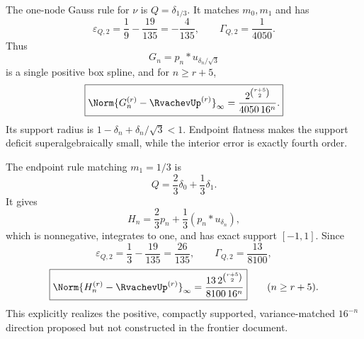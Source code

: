 \documentclass[11pt,oneside]{article}
\numberwithin{equation}{section}
\theoremstyle{definition}
\theoremstyle{remark}
\begin{document}
\begin{example}
\label{p3:ex:gauss-one}
The one-node Gauss rule for $\nu$ is $Q=\delta_{1/3}$.  It matches $m_0,m_1$ and
has
\[
 \varepsilon_{Q,2}=\frac19-\frac{19}{135}=-\frac4{135},
 \qquad \Gamma_{Q,2}=\frac1{4050}.
\]
Thus
\begin{equation}
 G_n=p_n*u_{\delta_n/\sqrt3}
 \label{p3:eq:Gn}
\end{equation}
is a single positive box spline, and for $n\ge r+5$,
\begin{equation}
 \boxed{
 \Norm{G_n^{(r)}-\RvachevUp^{(r)}}_\infty
 =\frac{2^{\binom{r+5}{2}}}{4050\,16^n}.}
 \label{p3:eq:Gauss-one-law}
\end{equation}
Its support radius is $1-\delta_n+\delta_n/\sqrt3<1$.  Endpoint flatness makes the
support deficit superalgebraically small, while the interior error is exactly fourth
order.
\end{example}

\begin{example}
\label{p3:ex:lobatto-two}
The endpoint rule matching $m_1=1/3$ is
\begin{equation}
 Q=\frac23\delta_0+\frac13\delta_1.
 \label{p3:eq:lobatto-Q}
\end{equation}
It gives
\begin{equation}
 H_n=\frac23p_n+\frac13(p_n*u_{\delta_n}),
 \label{p3:eq:Hn}
\end{equation}
which is nonnegative, integrates to one, and has exact support $[-1,1]$.  Since
\[
 \varepsilon_{Q,2}=\frac13-\frac{19}{135}=\frac{26}{135},
 \qquad \Gamma_{Q,2}=\frac{13}{8100},
\]
\begin{equation}
 \boxed{
 \Norm{H_n^{(r)}-\RvachevUp^{(r)}}_\infty
 =\frac{13\,2^{\binom{r+5}{2}}}{8100\,16^n}}
 \qquad(n\ge r+5).
 \label{p3:eq:Lobatto-two-law}
\end{equation}
This explicitly realizes the positive, compactly supported, variance-matched
$16^{-n}$ direction proposed but not constructed in the frontier document.
\end{example}
\end{document}
